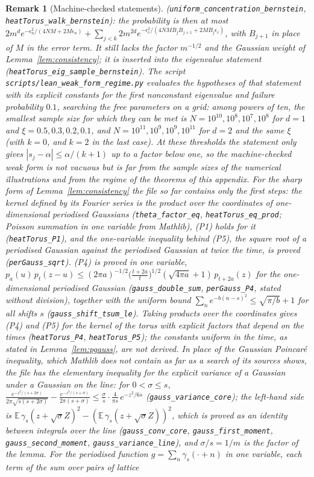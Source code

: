 \documentclass[11pt,a4paper]{article}
\theoremstyle{stmt}
\theoremstyle{defn}
\theoremstyle{rmk}
\newtheorem{remark}[theorem]{Remark}
\numberwithin{equation}{section}
\begin{document}
{\begin{remark}[Machine-checked statements]
(\texttt{uniform\_concentration\_bernstein}, \texttt{heatTorus\_walk\_bernstein}): the probability is then at most $2m^de^{-\epsilon_n^2/(4NM+2M\epsilon_n)}+\sum_{j<k}2m^{2d}e^{-\epsilon_c^2/(4NMB_jB_{j+1}+2MB_j\epsilon_c)}$, with $B_{j+1}$ in place of $M$ in the error term. It still lacks the factor $m^{-1/2}$ and the Gaussian weight of Lemma~\ref{lem:consistency}; it is inserted into the eigenvalue statement (\texttt{heatTorus\_eig\_sample\_bernstein}). The script \texttt{scripts/lean\_weak\_form\_regime.py} evaluates the hypotheses of that statement with its explicit constants for the first nonconstant eigenvalue and failure probability $0.1$, searching the free parameters on a grid: among powers of ten, the smallest sample size for which they can be met is $N=10^{10},10^{8},10^{7},10^{8}$ for $d=1$ and $\xi=0.5,0.3,0.2,0.1$, and $N=10^{11},10^{9},10^{9},10^{11}$ for $d=2$ and the same $\xi$ (with $k=0$, and $k=2$ in the last case). At these thresholds the statement only gives $|s_j-\alpha|\le\alpha/(k+1)$ up to a factor below one, so the machine-checked weak form is not vacuous but is far from the sample sizes of the numerical illustrations and from the regime of the theorems of this appendix. For the sharp form of Lemma~\ref{lem:consistency} the file so far contains only the first steps: the kernel defined by its Fourier series is the product over the coordinates of one-dimensional periodised Gaussians (\texttt{theta\_factor\_eq}, \texttt{heatTorus\_eq\_prod}; Poisson summation in one variable from Mathlib), (P1) holds for it (\texttt{heatTorus\_P1}), and the one-variable inequality behind (P5), the square root of a periodised Gaussian against the periodised Gaussian at twice the time, is proved (\texttt{perGauss\_sqrt}). (P4) is proved in one variable, $p_a(u)\,p_t(z-u)\le(2\pi a)^{-1/2}\big(\tfrac{t+2a}{t}\big)^{1/2}(\sqrt{4\pi a}+1)\,p_{t+2a}(z)$ for the one-dimensional periodised Gaussian (\texttt{gauss\_double\_sum}, \texttt{perGauss\_P4}, stated without division), together with the uniform bound $\sum_ne^{-b(n-s)^2}\le\sqrt{\pi/b}+1$ for all shifts $s$ (\texttt{gauss\_shift\_tsum\_le}). Taking products over the coordinates gives (P4) and (P5) for the kernel of the torus with explicit factors that depend on the times (\texttt{heatTorus\_P4}, \texttt{heatTorus\_P5}); the constants uniform in the time, as stated in Lemma~\ref{lem:pgauss}, are not derived. In place of the Gaussian Poincar\'e inequality, which Mathlib does not contain as far as a search of its sources shows, the file has the elementary inequality for the explicit variance of a Gaussian under a Gaussian on the line: for $0<\sigma\le s$, $\frac{e^{-z^2/(s+2\sigma)}}{2\pi\sqrt{s(s+2\sigma)}}-\frac{e^{-z^2/(s+\sigma)}}{2\pi(s+\sigma)}\le\frac\sigma s\cdot\frac4{\pi s}\,e^{-z^2/6s}$ (\texttt{gauss\_variance\_core}); the left-hand side is $\mathbb E\,\gamma_s(z+\sqrt\sigma Z)^2-(\mathbb E\,\gamma_s(z+\sqrt\sigma Z))^2$, which is proved as an identity between integrals over the line (\texttt{gauss\_conv\_core}, \texttt{gauss\_first\_moment}, \texttt{gauss\_second\_moment}, \texttt{gauss\_variance\_line}), and $\sigma/s=1/m$ is the factor of the lemma. For the periodised function $g=\sum_n\gamma_s(\cdot+n)$ in one variable, each term of the sum over pairs of lattice 
\end{remark}}
\end{document}
